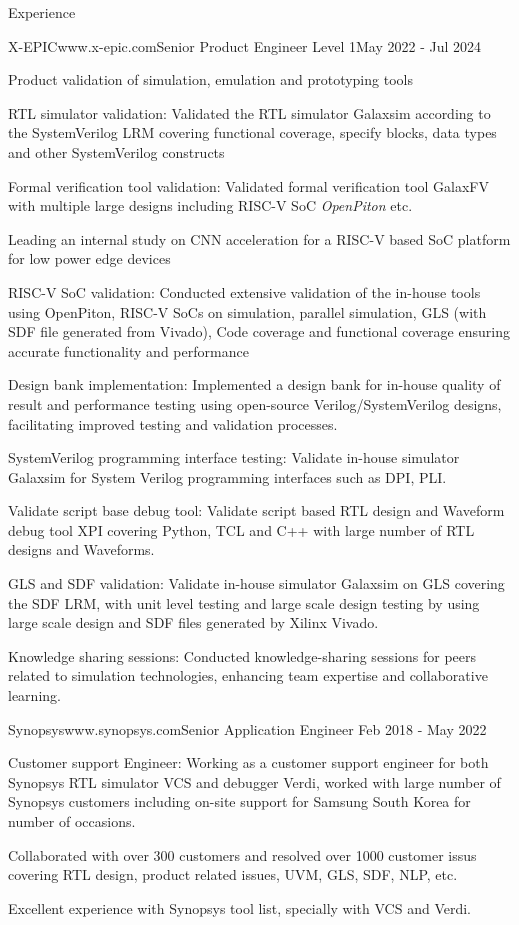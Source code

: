 \documentclass[
11pt, %
]{./assets/resume} %
\begin{document}
\begin{rSection}{Experience}
	\begin{rSubsectionX}{X-EPIC}{www.x-epic.com}{Senior Product Engineer Level 1}{May 2022 - Jul 2024}
		\item Product validation of simulation, emulation and prototyping tools
		\item RTL simulator validation: Validated the RTL simulator Galaxsim according to the SystemVerilog LRM covering functional coverage, specify blocks, data types and other SystemVerilog constructs
		\item Formal verification tool validation: Validated formal verification tool GalaxFV with multiple large designs including RISC-V SoC \textit{OpenPiton} etc.
		\item Leading an internal study on CNN acceleration for a RISC-V based SoC platform for low power edge devices
		\item RISC-V SoC validation: Conducted extensive validation of the in-house tools using OpenPiton, RISC-V SoCs on simulation, parallel simulation, GLS (with SDF file generated from Vivado), Code coverage and functional coverage ensuring accurate functionality and performance
		\item Design bank implementation: Implemented a design bank for in-house quality of result and performance testing using open-source Verilog/SystemVerilog designs, facilitating improved testing and validation processes.
		\item SystemVerilog programming interface testing: Validate in-house simulator Galaxsim for System Verilog programming interfaces such as DPI, PLI.
		\item Validate script base debug tool: Validate script based RTL design and Waveform debug tool XPI covering Python, TCL and C++ with large number of RTL designs and Waveforms.
		\item GLS and SDF validation: Validate in-house simulator Galaxsim on GLS covering the SDF LRM, with unit level testing and large scale design testing by using large scale design and SDF files generated by Xilinx Vivado.
		\item Knowledge sharing sessions: Conducted knowledge-sharing sessions for peers related to simulation technologies, enhancing team expertise and collaborative learning.
	\end{rSubsectionX}
	\begin{rSubsectionX}{Synopsys}{www.synopsys.com}{Senior Application Engineer }{Feb 2018 - May 2022}
		\item Customer support Engineer: Working as a customer support engineer for both Synopsys RTL simulator VCS and debugger Verdi, worked with large number of Synopsys customers including on-site support for Samsung South Korea for number of occasions.
		\item Collaborated with over 300 customers and resolved over 1000 customer issus covering RTL design, product related issues, UVM, GLS, SDF, NLP, etc.
		\item Excellent experience with Synopsys tool list, specially with VCS and Verdi.
	\end{rSubsectionX}
	

\end{rSection}
\end{document}
